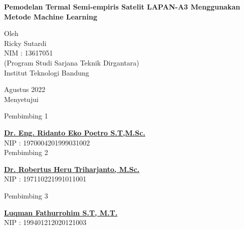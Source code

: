 \begin{center}
       \Large
        \vspace{1.5cm}
        \large
        \textbf{Pemodelan Termal Semi-empiris Satelit LAPAN-A3 Menggunakan Metode Machine Learning}\\
        
        \vfill
        
        Oleh\\
        Ricky Sutardi\\
        NIM : 13617051\\
        (Program Studi Sarjana Teknik Dirgantara)\\
        Institut Teknologi Bandung
       
       \vfill
       
       Agustus 2022\\
        \vspace{1.0cm}
       Menyetujui\\
       \begin{multicols}{2}
       
       \footnotesize Pembimbing 1 \\
       \vspace{3.5cm}
       
        \footnotesize \textbf{\underline{Dr. Eng. Ridanto Eko Poetro S.T,M.Sc.}}\\
				\footnotesize NIP : 1970004201999031002 \\
        
        \footnotesize Pembimbing 2 \\
       \vspace{3.5cm}
       
       \footnotesize  \textbf{\underline{Dr. Robertus Heru Triharjanto, M.Sc.}}\\
        \footnotesize NIP : 197110221991011001 \\
        \end{multicols}

       \footnotesize Pembimbing 3 \\
       \vspace{3.5cm}
       
       \footnotesize \textbf{\underline{Luqman Fathurrohim S.T, M.T.}}\\
        \footnotesize NIP : 199401212020121003 \\
       
\end{center}
